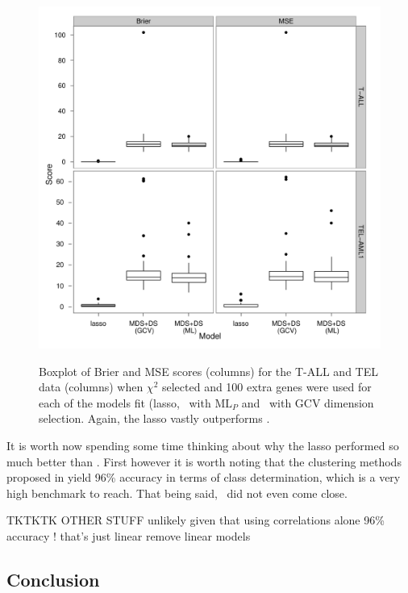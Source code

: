 \begin{figure}
\centering
\includegraphics[width=6in]{gds/figs/confsim-msebrier.pdf} \\
\caption{Boxplot of Brier and MSE scores (columns) for the T-ALL and TEL data (columns) when $\chi^2$ selected and 100 extra genes were used for each of the models fit (lasso, \mdsds\ with $\text{ML}_P$ and \mdsds\ with GCV dimension selection. Again, the lasso vastly outperforms \mdsds.}
\label{leuk-confsim-boxplot}
\end{figure}

It is worth now spending some time thinking about why the lasso performed so much better than \mdsds. First however it is worth noting that the clustering methods proposed in \cite{yeoh2002} yield 96\% accuracy in terms of class determination, which is a very high benchmark to reach. That being said, \mdsds\ did not even come close.




TKTKTK OTHER STUFF
   unlikely given that using correlations alone 96\% accuracy ! that's just linear
   remove linear models

\subsection{Conclusion}

